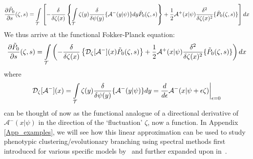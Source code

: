 \begin{equation*}
\frac{\partial \Tilde{P}_{0}}{\partial s}(\zeta,s) = \int\limits_{\mathcal{T}}\left[-\frac{\delta}{\delta \zeta(x)}\left\{\int\limits_{\mathcal{T}}\zeta(y)\frac{\delta}{\delta \psi(y)}\{\mathcal{A}^{-}(y|\psi)\}dy\Tilde{P}_{0}(\zeta,s)\right\}+\frac{1}{2}\mathcal{A}^{+}(x|\psi)\frac{\delta^2}{\delta\zeta(x)^2}\{\Tilde{P}_{0}(\zeta,s)\}\right]dx
\end{equation*}
We thus arrive at the functional Fokker-Planck equation:
\begin{equation}
\label{functional_WNE_zeroth_order}
    \frac{\partial \Tilde{P}_{0}}{\partial s}(\zeta,s) = \int\limits_{\mathcal{T}}\left(-\frac{\delta}{\delta \zeta(x)}\left\{\mathcal{D}_{\zeta}[\mathcal{A}^{-}](x)\Tilde{P}_{0}(\zeta,s)\right\}+\frac{1}{2}\mathcal{A}^{+}(x|\psi)\frac{\delta^2}{\delta\zeta(x)^2}\{\Tilde{P}_{0}(\zeta,s)\}\right)dx
\end{equation}
where 
\begin{equation*}
\mathcal{D}_{\zeta}[\mathcal{A}^{-}](x) = \int\limits_{\mathcal{T}}\zeta(y)\frac{\delta}{\delta \psi(y)}\{\mathcal{A}^{-}(y|\psi)\}dy = \frac{d}{d\epsilon}\mathcal{A}^-(x|\psi + \epsilon \zeta) \bigg{|}_{\epsilon = 0}
\end{equation*}
can be thought of now as the functional analogue of a directional derivative of $\mathcal{A}^-(x|\psi)$ in the direction of the `fluctuation' $\zeta$, now a function. In Appendix \ref{App_examples}, we will see how this linear approximation can be used to study phenotypic clustering/evolutionary branching using spectral methods first introduced for various specific models by~\citet{rogers_demographic_2012} and further expanded upon in~\citet{rogers_modes_2015}.